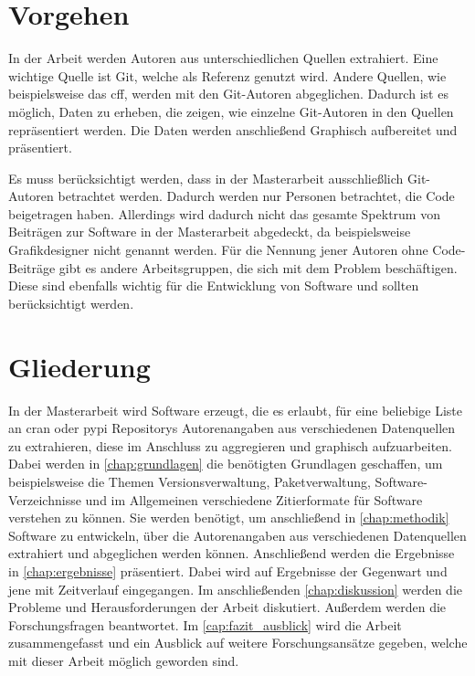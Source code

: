 \section{Vorgehen}
\label{sec:vorgehen}
In der Arbeit werden Autoren aus unterschiedlichen Quellen extrahiert.
Eine wichtige Quelle ist Git, welche als Referenz genutzt wird.
Andere Quellen, wie beispielsweise das \gls{cff}, werden mit den Git-Autoren abgeglichen.
Dadurch ist es möglich, Daten zu erheben, die zeigen, wie einzelne Git-Autoren in den Quellen repräsentiert werden.
Die Daten werden anschließend Graphisch aufbereitet und präsentiert.

Es muss berücksichtigt werden, dass in der Masterarbeit ausschließlich Git-Autoren betrachtet werden.
Dadurch werden nur Personen betrachtet, die Code beigetragen haben.
Allerdings wird dadurch nicht das gesamte Spektrum von Beiträgen zur Software in der Masterarbeit abgedeckt, da beispielsweise Grafikdesigner nicht genannt werden.
Für die Nennung jener Autoren ohne Code-Beiträge gibt es andere Arbeitsgruppen, die sich mit dem Problem beschäftigen.
Diese sind ebenfalls wichtig für die Entwicklung von Software und sollten berücksichtigt werden.

\section{Gliederung}
\label{sec:gliederung}
In der Masterarbeit wird Software erzeugt, die es erlaubt, für eine beliebige Liste an \gls{cran} oder \gls{pypi} Repositorys Autorenangaben aus verschiedenen Datenquellen zu extrahieren, diese im Anschluss zu aggregieren und graphisch aufzuarbeiten.
Dabei werden in \autoref{chap:grundlagen} die benötigten Grundlagen geschaffen, um beispielsweise die Themen Versionsverwaltung, Paketverwaltung, Software-Verzeichnisse und im Allgemeinen verschiedene Zitierformate für Software verstehen zu können.
Sie werden benötigt, um anschließend in \autoref{chap:methodik} Software zu entwickeln, über die Autorenangaben aus verschiedenen Datenquellen extrahiert und abgeglichen werden können.
Anschließend werden die Ergebnisse in \autoref{chap:ergebnisse} präsentiert.
Dabei wird auf Ergebnisse der Gegenwart und jene mit Zeitverlauf eingegangen.
Im anschließenden \autoref{chap:diskussion} werden die Probleme und Herausforderungen der Arbeit diskutiert.
Außerdem werden die Forschungsfragen beantwortet.
Im \autoref{cap:fazit_ausblick} wird die Arbeit zusammengefasst und ein Ausblick auf weitere Forschungsansätze gegeben, welche mit dieser Arbeit möglich geworden sind.
